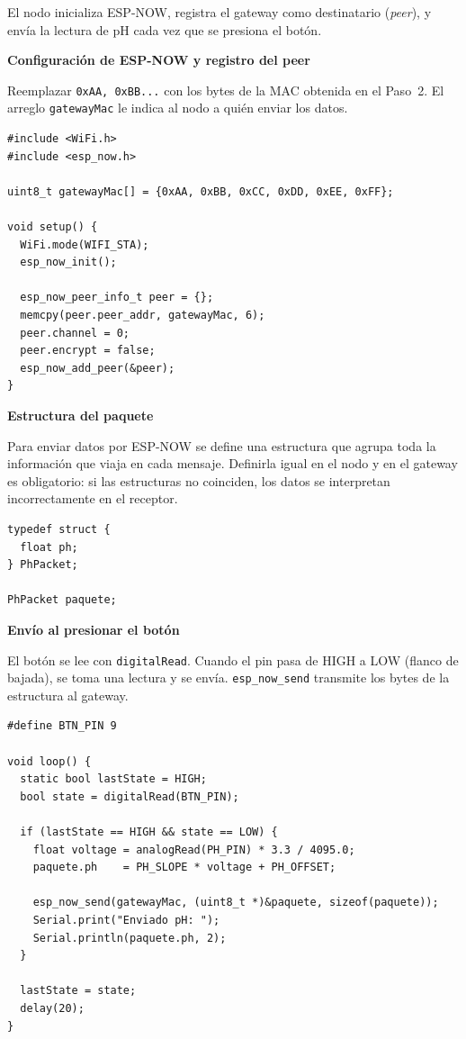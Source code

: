 \documentclass[12pt,leqno]{article}
\begin{document}
El nodo inicializa ESP-NOW, registra el gateway como destinatario
(\textit{peer}), y env\'ia la lectura de pH cada vez que se presiona el bot\'on.

\bigskip
\noindent\textbf{Configuraci\'on de ESP-NOW y registro del peer}

\smallskip
\noindent Reemplazar \texttt{0xAA, 0xBB...} con los bytes de la MAC obtenida en el
Paso~2. El arreglo \texttt{gatewayMac} le indica al nodo a qui\'en enviar los datos.

\begin{lstlisting}
#include <WiFi.h>
#include <esp_now.h>

uint8_t gatewayMac[] = {0xAA, 0xBB, 0xCC, 0xDD, 0xEE, 0xFF};

void setup() {
  WiFi.mode(WIFI_STA);
  esp_now_init();

  esp_now_peer_info_t peer = {};
  memcpy(peer.peer_addr, gatewayMac, 6);
  peer.channel = 0;
  peer.encrypt = false;
  esp_now_add_peer(&peer);
}
\end{lstlisting}

\bigskip
\noindent\textbf{Estructura del paquete}

\smallskip
\noindent Para enviar datos por ESP-NOW se define una estructura que agrupa toda la
informaci\'on que viaja en cada mensaje. Definirla igual en el nodo y en el gateway
es obligatorio: si las estructuras no coinciden, los datos se interpretan
incorrectamente en el receptor.

\begin{lstlisting}
typedef struct {
  float ph;
} PhPacket;

PhPacket paquete;
\end{lstlisting}

\bigskip
\noindent\textbf{Env\'io al presionar el bot\'on}

\smallskip
\noindent El bot\'on se lee con \texttt{digitalRead}. Cuando el pin pasa de HIGH a
LOW (flanco de bajada), se toma una lectura y se env\'ia. \texttt{esp\_now\_send}
transmite los bytes de la estructura al gateway.

\begin{lstlisting}
#define BTN_PIN 9

void loop() {
  static bool lastState = HIGH;
  bool state = digitalRead(BTN_PIN);

  if (lastState == HIGH && state == LOW) {
    float voltage = analogRead(PH_PIN) * 3.3 / 4095.0;
    paquete.ph    = PH_SLOPE * voltage + PH_OFFSET;

    esp_now_send(gatewayMac, (uint8_t *)&paquete, sizeof(paquete));
    Serial.print("Enviado pH: ");
    Serial.println(paquete.ph, 2);
  }

  lastState = state;
  delay(20);
}
\end{lstlisting}
\end{document}
